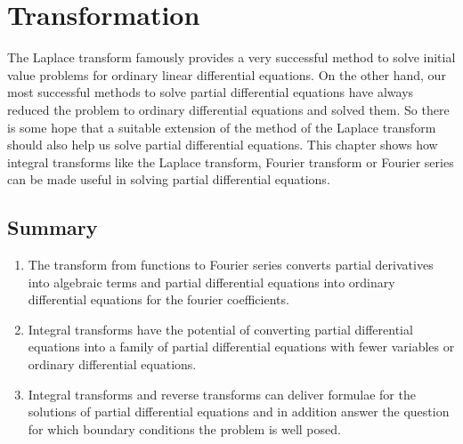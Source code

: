 %
%
%
\chapter{Transformation}
The Laplace transform famously provides a very successful method
to solve initial value problems for ordinary linear differential equations.
On the other hand, our most successful methods to solve partial differential
equations have always reduced the problem to ordinary differential
equations and solved them.
So there is some hope that a suitable extension of the method of the
Laplace transform should also help us solve partial differential
equations.
This chapter shows how integral transforms like the Laplace transform,
Fourier transform or Fourier series can be made useful in solving
partial differential equations.







\section{Summary}
\begin{enumerate}
\item
The transform from functions to Fourier series converts
partial derivatives into algebraic terms and partial differential
equations into ordinary differential equations for the
fourier coefficients.
\item
Integral transforms have the potential of converting partial differential
equations into a family of partial differential equations with fewer
variables or ordinary differential equations.
\item
Integral transforms and reverse transforms can deliver formulae for the
solutions of partial differential equations and in addition answer
the question for which boundary conditions the problem is well posed.
\end{enumerate}
